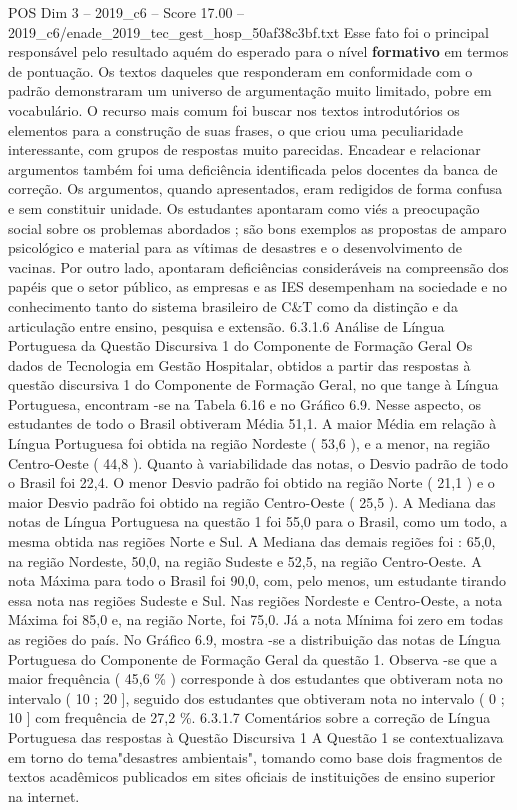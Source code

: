 \begin{textsample}{POS Dim 3 – 2019\_c6 – Score 17.00 – 2019\_c6/enade\_2019\_tec\_gest\_hosp\_50af38c3bf.txt}
Esse fato foi o principal responsável pelo resultado aquém do esperado para o nível \textbf{formativo} em termos de pontuação.
Os textos daqueles que responderam em conformidade com o padrão demonstraram um universo de argumentação muito limitado, pobre em vocabulário.
O recurso mais comum foi buscar nos textos introdutórios os elementos para a construção de suas frases, o que criou uma peculiaridade interessante, com grupos de respostas muito parecidas.
Encadear e relacionar argumentos também foi uma deficiência identificada pelos docentes da banca de correção.
Os argumentos, quando apresentados, eram redigidos de forma confusa e sem constituir unidade.
Os estudantes apontaram como viés a preocupação social sobre os problemas abordados ; são bons exemplos as propostas de amparo psicológico e material para as vítimas de desastres e o desenvolvimento de vacinas.
Por outro lado, apontaram deficiências consideráveis na compreensão dos papéis que o setor público, as empresas e as IES desempenham na sociedade e no conhecimento tanto do sistema brasileiro de C\&T como da distinção e da articulação entre ensino, pesquisa e extensão. 6.3.1.6 Análise de Língua Portuguesa da Questão Discursiva 1 do Componente de Formação Geral Os dados de Tecnologia em Gestão Hospitalar, obtidos a partir das respostas à questão discursiva 1 do Componente de Formação Geral, no que tange à Língua Portuguesa, encontram -se na Tabela 6.16 e no Gráfico 6.9.
Nesse aspecto, os estudantes de todo o Brasil obtiveram Média 51,1.
A maior Média em relação à Língua Portuguesa foi obtida na região Nordeste ( 53,6 ), e a menor, na região Centro-Oeste ( 44,8 ).
Quanto à variabilidade das notas, o Desvio padrão de todo o Brasil foi 22,4.
O menor Desvio padrão foi obtido na região Norte ( 21,1 ) e o maior Desvio padrão foi obtido na região Centro-Oeste ( 25,5 ).
A Mediana das notas de Língua Portuguesa na questão 1 foi 55,0 para o Brasil, como um todo, a mesma obtida nas regiões Norte e Sul.
A Mediana das demais regiões foi : 65,0, na região Nordeste, 50,0, na região Sudeste e 52,5, na região Centro-Oeste.
A nota Máxima para todo o Brasil foi 90,0, com, pelo menos, um estudante tirando essa nota nas regiões Sudeste e Sul.
Nas regiões Nordeste e Centro-Oeste, a nota Máxima foi 85,0 e, na região Norte, foi 75,0.
Já a nota Mínima foi zero em todas as regiões do país.
No Gráfico 6.9, mostra -se a distribuição das notas de Língua Portuguesa do Componente de Formação Geral da questão 1.
Observa -se que a maior frequência ( 45,6 \% ) corresponde à dos estudantes que obtiveram nota no intervalo ( 10 ; 20 ], seguido dos estudantes que obtiveram nota no intervalo ( 0 ; 10 ] com frequência de 27,2 \%. 6.3.1.7 Comentários sobre a correção de Língua Portuguesa das respostas à Questão Discursiva 1 A Questão 1 se contextualizava em torno do tema"desastres ambientais", tomando como base dois fragmentos de textos acadêmicos publicados em sites oficiais de instituições de ensino superior na internet.

\end{textsample}
